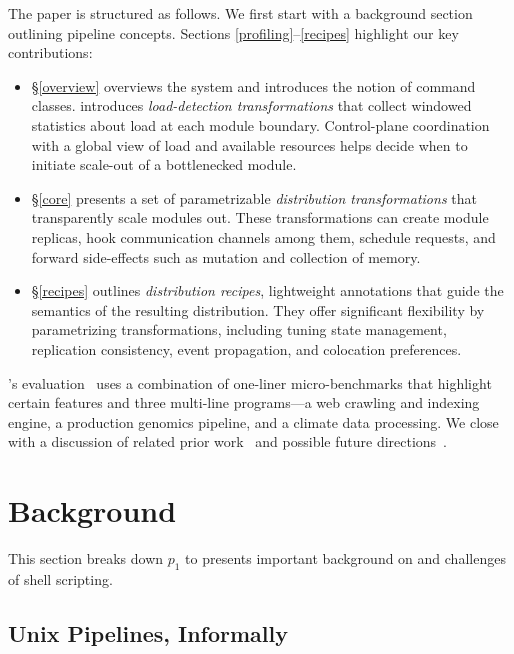 \documentclass[sigplan,10pt,review,anonymous]{acmart}
\newcommand{\eat}[1]{}
\begin{document}
The paper is structured as follows.
We first start with a background section outlining pipeline concepts.
Sections \ref{profiling}--\ref{recipes} highlight our key contributions:
\begin{itemize}

  \item
  \S\ref{overview} overviews the system and introduces the notion of command classes.
	introduces \emph{load-detection transformations} that collect windowed statistics about load at each module boundary.
  Control-plane coordination with a global view of load and available resources helps decide when to initiate scale-out of a bottlenecked module.

  \item
  \S\ref{core} presents a set of parametrizable \emph{distribution transformations} that transparently scale modules out.
  These transformations can create module replicas, hook communication channels among them, schedule requests, and forward side-effects such as mutation and collection of memory.

  \item
  \S\ref{recipes} outlines \emph{distribution recipes}, lightweight annotations that guide the semantics of the resulting distribution.
  They offer significant flexibility by\eat{ generating configurations that} parametrizing transformations, including tuning state management, replication consistency, event propagation, and colocation preferences.
\end{itemize}

\noindent
\sys's evaluation~ uses a combination of one-liner micro-benchmarks that highlight certain features and three multi-line programs---a web crawling and indexing engine, a production genomics pipeline, and a climate data processing.
We close with a discussion of related prior work~ and possible future directions~.

\section{Background}
\label{bg}

This section breaks down $p_1$ to presents important background on and challenges
of shell scripting.

\subsection{Unix Pipelines, Informally}
\label{bg:pipelines}
\end{document}

